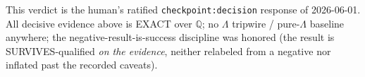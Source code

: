 This verdict is the human's ratified \texttt{checkpoint:decision} response of 2026-06-01.
All decisive evidence above is EXACT over $\mathbb{Q}$; no $\Lambda$ tripwire / pure-$\Lambda$
baseline anywhere; the negative-result-is-success discipline was honored (the result is
SURVIVES-qualified \emph{on the evidence}, neither relabeled from a negative nor inflated
past the recorded caveats).
